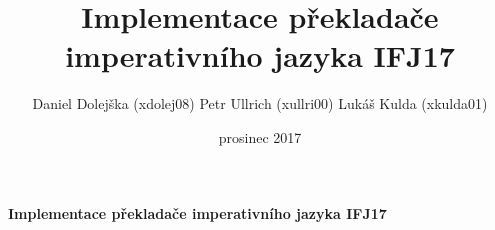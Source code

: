 \documentclass[a4paper,11pt]{article}
\title{Implementace překladače imperativního jazyka IFJ17}
\author{
	Daniel Dolejška (xdolej08)
	\newline
	Petr Ullrich (xullri00)
	\newline
	Lukáš Kulda (xkulda01)
}
\date{prosinec 2017}
\begin{document}
\begin{titlepage}
	\centering
	
	\huge\textbf{Implementace překladače imperativního jazyka IFJ17}

	
\end{titlepage}

\newpage
	
\end{document}
